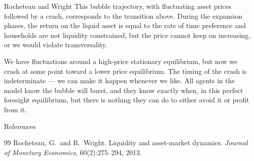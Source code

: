 \documentclass[aspectratio=169,xcolor=dvipsnames]{beamer}
\begin{document}
\begin{frame}{Rocheteau and Wright}
    This bubble trajectory, with fluctuating asset prices followed by a crash, corresponds to the transition above. During the expansion phases, the return on the liquid asset is equal to the rate of time preference and households are not liquidity constrained, but the price cannot keep on increasing, or we would violate transversality.

    We have fluctuations around a high-price stationary equilibrium, but now we crash at some point toward a lower price equilibrium. The timing of the crash is indeterminate --- we can make it happen whenever we like. All agents in the model know the bubble will burst, and they know exactly when, in this perfect foresight equilibrium, but there is nothing they can do to either avoid it or profit from it.
\end{frame}

\begin{frame}[allowframebreaks]{References}
    \small
    \begin{thebibliography}{99}
            Rocheteau, G.\ and R.\ Wright. Liquidity and asset-market dynamics. \textit{Journal of Monetary Economics}, 60(2):275--294, 2013.
    \end{thebibliography}
\end{frame}
\end{document}
